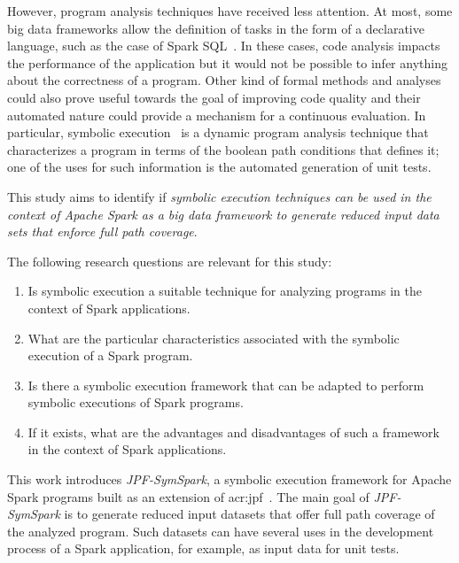 However, program analysis techniques have received less attention. At most, some big data frameworks allow the definition of tasks in the form of a declarative language, such as the case of Spark SQL~\cite{Armbrust2015}. In these cases, code analysis impacts the performance of the application but it would not be possible to infer anything about the correctness of a program. Other kind of formal methods and analyses could also prove useful towards the goal of improving code quality and their automated nature could provide a mechanism for a continuous evaluation. In particular, symbolic execution~\cite{Hoare1969,King1976} is a dynamic program analysis technique that characterizes a program in terms of the boolean path conditions that defines it; one of the uses for such information is the automated generation of unit tests. 

This study aims to identify if \textit{symbolic execution techniques can be used in the context of Apache Spark as a big data framework to generate reduced input data sets that enforce full path coverage}.

The following research questions are relevant for this study:

\begin{enumerate}
	\item Is symbolic execution a suitable technique for analyzing programs in the context of Spark applications.
	\item What are the particular characteristics associated with the symbolic execution of a Spark program.
	\item Is there a symbolic execution framework that can be adapted to perform symbolic executions of Spark programs.
	\item If it exists, what are the advantages and disadvantages of such a framework in the context of Spark applications.	
\end{enumerate}

\label{sec:contributions}

This work introduces \textit{JPF-SymSpark}, a symbolic execution framework for Apache Spark programs built as an extension of \acrfull{acr:jpf}~\cite{Visser2003}. The main goal of \textit{JPF-SymSpark} is to generate reduced input datasets that offer full path coverage of the analyzed program. Such datasets can have several uses in the development process of a Spark application, for example, as input data for unit tests.

